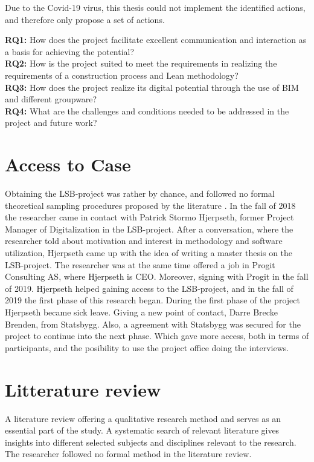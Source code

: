 Due to the Covid-19 virus, this thesis could not implement the identified actions, and therefore only propose a set of actions.

{\noindent \bf RQ1:} How does the project facilitate excellent communication and interaction as a basis for achieving the potential? \\
{\noindent  \bf RQ2:} How is the project suited to meet the requirements in realizing the requirements of a construction process and Lean methodology? \\
{\noindent  \bf RQ3:} How does the project realize its digital potential through the use of BIM and different groupware? \\
{\noindent  \bf RQ4:} What are the challenges and conditions needed to be addressed in the project and future work? \\

\section{Access to Case}
Obtaining the LSB-project was rather by chance, and followed no formal theoretical sampling procedures proposed by the literature \citep{yin1993case}. In the fall of 2018 the researcher came in contact with Patrick Stormo Hjerpseth, former Project Manager of Digitalization in the LSB-project. After a conversation, where the researcher told about motivation and interest in methodology and software utilization, Hjerpseth came up with the idea of writing a master thesis on the LSB-project. The researcher was at the same time offered a job in Progit Consulting AS, where Hjerpseth is CEO. Moreover, signing with Progit in the fall of 2019. Hjerpseth helped gaining access to the LSB-project, and in the fall of 2019 the first phase of this research began. During the first phase of the project Hjerpseth became sick leave. Giving a new point of contact, Darre Brecke Brenden, from Statsbygg. Also, a agreement with Statsbygg was secured for the project to continue into the next phase. Which gave more access, both in terms of participants, and the posibility to use the project office doing the interviews.  

\section{Litterature review}
A literature review offering a qualitative research method and serves as an essential part of the study. A systematic search of relevant literature gives insights into different selected subjects and disciplines relevant to the research. The researcher followed no formal method in the literature review.

